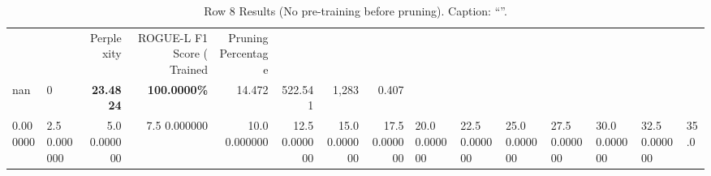 \begin{table}
\caption{Row 8 Results (No pre-training before pruning). \ifshowcaption{}Caption: ``''.\fi}
\label{tab:evaluation-pipeline-8-untrained}
\begin{tabular}{llrrrrrr}
 &  & Perplexity & ROGUE-L F1 Score (%
Trained & Pruning Percentage &  &  &  &  &  &  \\
nan & 0 & \bfseries 23.4824 & \bfseries 100.0000\% & 14.472 & 522.541 & 1,283 & 0.407 \\
0.000000 & 2.5%
0.000000 & 5.0%
0.000000 & 7.5%
0.000000 & 10.0%
0.000000 & 12.5%
0.000000 & 15.0%
0.000000 & 17.5%
0.000000 & 20.0%
0.000000 & 22.5%
0.000000 & 25.0%
0.000000 & 27.5%
0.000000 & 30.0%
0.000000 & 32.5%
0.000000 & 35.0%

\end{tabular}
\end{table}
